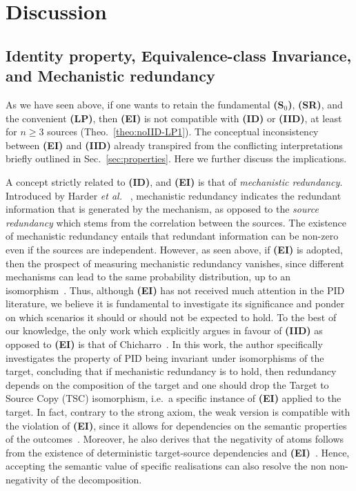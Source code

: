 \documentclass{article}
\makeatletter
\newcommand{\etal}{\textit{et al.\@} }
\newcommand{\ts}[1]{\ensuremath{_{\text{#1}}}}
\newcommand{\SR}{\textbf{(SR)}\xspace} %
\newcommand{\Sz}{\textbf{(S\ts{0})}\xspace} %
\newcommand{\ID}{\textbf{(ID)}\xspace} %
\newcommand{\IID}{\textbf{(IID)}\xspace} %
\newcommand{\EI}{\textbf{(EI)}\xspace} %
\newcommand{\LP}{\textbf{(LP)}\xspace}
\makeatother
\begin{document}
\section{Discussion} \label{sec:discussion}

\subsection{Identity property, Equivalence-class Invariance, and Mechanistic redundancy}\label{sec:MR-ID-EI}
As we have seen above, if one wants to retain the fundamental \Sz, \SR, and the convenient \LP, then \EI is not compatible with \ID or \IID, at least for $n\ge3$ sources (Theo.~\ref{theo:noIID-LP1}). %
The conceptual inconsistency between \EI and \IID already transpired from the conflicting interpretations briefly outlined in Sec.~\ref{sec:properties}. Here we further discuss the implications.

A concept strictly related to \ID, and \EI is that of \textit{mechanistic redundancy}. Introduced by Harder \etal~\cite{harder2013bivariate}, mechanistic redundancy indicates the redundant information that is generated by the mechanism, as opposed to the \textit{source redundancy} which stems from the correlation between the sources. The existence of mechanistic redundancy entails that redundant information can be non-zero even if the sources are independent. However, as seen above, if \EI is adopted, then the prospect of measuring mechanistic redundancy vanishes, since different mechanisms can lead to the same probability distribution, up to an isomorphism~\cite{pearl2014probabilistic}.
Thus, although \EI has not received much attention in the PID literature, we believe it is fundamental to investigate its significance and ponder on which scenarios it should or should not be expected to hold. 
To the best of our knowledge, the only work which explicitly argues in favour of \IID as opposed to \EI is that of Chicharro~\cite{chicharro2018identity}. In this work, the author specifically investigates the property of PID being invariant under isomorphisms of the target, concluding that if mechanistic redundancy is to hold, then redundancy depends on the composition of the target and one should drop the Target to Source Copy (TSC) isomorphism, i.e.\ a specific instance of \EI applied to the target. 
In fact, contrary to the strong axiom, the weak version is compatible with the violation of \EI, since it allows for dependencies on the semantic properties of the outcomes~\cite{chicharro2018identity}. %
Moreover, he also derives that the negativity of atoms follows from the existence of deterministic target-source dependencies and \EI~\cite{chicharro2018identity}. Hence, accepting the semantic value of specific realisations can also resolve the non non-negativity of the decomposition. 
\end{document}
